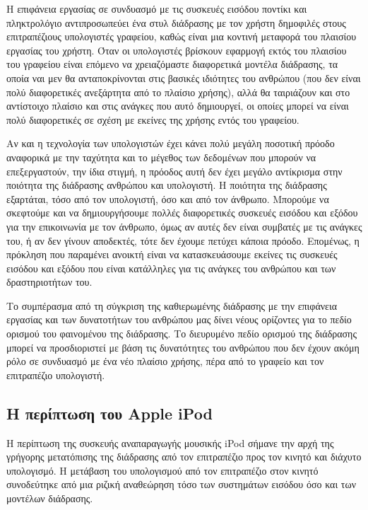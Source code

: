\documentclass[
]{article}
\begin{document}
Η επιφάνεια εργασίας σε συνδυασμό με τις συσκευές εισόδου ποντίκι και
πληκτρολόγιο αντιπροσωπεύει ένα στυλ διάδρασης με τον χρήστη δημοφιλές
στους επιτραπέζιους υπολογιστές γραφείου, καθώς είναι μια κοντινή
μεταφορά του πλαισίου εργασίας του χρήστη. Όταν οι υπολογιστές βρίσκουν
εφαρμογή εκτός του πλαισίου του γραφείου είναι επόμενο να χρειαζόμαστε
διαφορετικά μοντέλα διάδρασης, τα οποία ναι μεν θα ανταποκρίνονται στις
βασικές ιδιότητες του ανθρώπου (που δεν είναι πολύ διαφορετικές
ανεξάρτητα από το πλαίσιο χρήσης), αλλά θα ταιριάζουν και στο αντίστοιχο
πλαίσιο και στις ανάγκες που αυτό δημιουργεί, οι οποίες μπορεί να είναι
πολύ διαφορετικές σε σχέση με εκείνες της χρήσης εντός του γραφείου.

Αν και η τεχνολογία των υπολογιστών έχει κάνει πολύ μεγάλη ποσοτική
πρόοδο αναφορικά με την ταχύτητα και το μέγεθος των δεδομένων που
μπορούν να επεξεργαστούν, την ίδια στιγμή, η πρόοδος αυτή δεν έχει
μεγάλο αντίκρισμα στην ποιότητα της διάδρασης ανθρώπου και υπολογιστή. Η
ποιότητα της διάδρασης εξαρτάται, τόσο από τον υπολογιστή, όσο και από
τον άνθρωπο. Μπορούμε να σκεφτούμε και να δημιουργήσουμε πολλές
διαφορετικές συσκευές εισόδου και εξόδου για την επικοινωνία με τον
άνθρωπο, όμως αν αυτές δεν είναι συμβατές με τις ανάγκες του, ή αν δεν
γίνουν αποδεκτές, τότε δεν έχουμε πετύχει κάποια πρόοδο. Επομένως, η
πρόκληση που παραμένει ανοικτή είναι να κατασκευάσουμε εκείνες τις
συσκευές εισόδου και εξόδου που είναι κατάλληλες για τις ανάγκες του
ανθρώπου και των δραστηριοτήτων του.

Το συμπέρασμα από τη σύγκριση της καθιερωμένης διάδρασης με την
επιφάνεια εργασίας και των δυνατοτήτων του ανθρώπου μας δίνει νέους
ορίζοντες για το πεδίο ορισμού του φαινομένου της διάδρασης. Το
διευρυμένο πεδίο ορισμού της διάδρασης μπορεί να προσδιοριστεί με βάση
τις δυνατότητες του ανθρώπου που δεν έχουν ακόμη ρόλο σε συνδυασμό με
ένα νέο πλαίσιο χρήσης, πέρα από το γραφείο και τον επιτραπέζιο
υπολογιστή.

\hypertarget{ux3b7-ux3c0ux3b5ux3c1ux3afux3c0ux3c4ux3c9ux3c3ux3b7-ux3c4ux3bfux3c5-apple-ipod}{%
\subsection{Η περίπτωση του Apple
iPod}\label{ux3b7-ux3c0ux3b5ux3c1ux3afux3c0ux3c4ux3c9ux3c3ux3b7-ux3c4ux3bfux3c5-apple-ipod}}

Η περίπτωση της συσκευής αναπαραγωγής μουσικής iPod σήμανε την αρχή της
γρήγορης μετατόπισης της διάδρασης από τον επιτραπέζιο προς τον κινητό
και διάχυτο υπολογισμό. Η μετάβαση του υπολογισμού από τον επιτραπέζιο
στον κινητό συνοδεύτηκε από μια ριζική αναθεώρηση τόσο των συστημάτων
εισόδου όσο και των μοντέλων διάδρασης.
\end{document}
